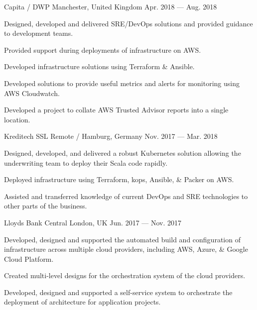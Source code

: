 \begin{cventries}
    {Capita / DWP}
    {Manchester, United Kingdom}
    {Apr. 2018 — Aug. 2018}
    {
        \begin{cvitems}
            \item{Designed, developed and delivered SRE/DevOps solutions and provided guidance to development teams.}
            \item{Provided support during deployments of infrastructure on AWS.}
            \item{Developed infrastructure solutions using Terraform \& Ansible.}
            \item{Developed solutions to provide useful metrics and alerts for monitoring using AWS Cloudwatch.}
            \item{Developed a project to collate AWS Trusted Advisor reports into a single location.}
        \end{cvitems}
    }

    {Kreditech SSL}
    {Remote / Hamburg, Germany}
    {Nov. 2017 — Mar. 2018}
    {
        \begin{cvitems}
            \item{Designed, developed, and delivered a robust Kubernetes solution allowing the underwriting team to deploy their Scala code rapidly.}
            \item{Deployed infrastructure using Terraform, kops, Ansible, \& Packer on AWS.}
            \item{Assisted and transferred knowledge of current DevOps and SRE technologies to other parts of the business.}
        \end{cvitems}
    }

    {Lloyds Bank}
    {Central London, UK}
    {Jun. 2017 — Nov. 2017}
    {
        \begin{cvitems}
        \item {Developed, designed and supported the automated build and configuration of infrastructure across multiple cloud providers, including AWS, Azure, \& Google Cloud Platform.}
        \item {Created multi-level designs for the orchestration system of the cloud providers.}
        \item {Developed, designed and supported a self-service system to orchestrate the deployment of architecture for application projects.}
        \end{cvitems}
    }


\end{cventries}
